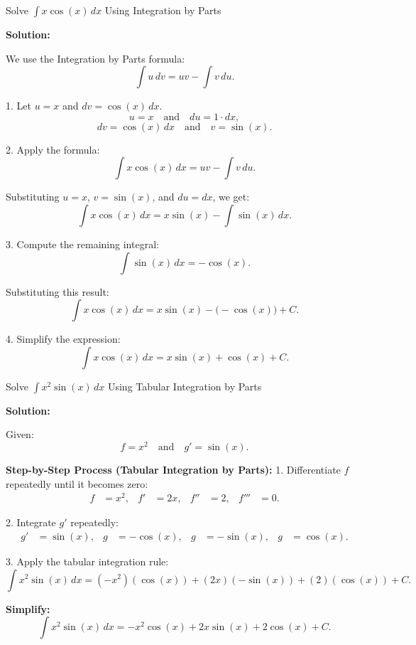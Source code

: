 \documentclass[12pt]{article}
\theoremstyle{beautifulthm}
\begin{document}
\begin{tcolorbox}[colback=examplebg, colframe=red!75!black, title=\textbf{EXAMPLE 1: Find the Integral of the Function}, fonttitle=\bfseries, sharp corners]
Solve \( \int x \cos(x) \, dx \) Using Integration by Parts


\tcblower
\textbf{Solution:} 

We use the Integration by Parts formula:
\[
\int u \, dv = uv - \int v \, du.
\]

1. Let \( u = x \) and \( dv = \cos(x) \, dx \).
   \[
   u = x \quad \text{and} \quad du = 1 \cdot dx,
   \]
   \[
   dv = \cos(x) \, dx \quad \text{and} \quad v = \sin(x).
   \]

2. Apply the formula:
   \[
   \int x \cos(x) \, dx = u v - \int v \, du.
   \]

   Substituting \( u = x \), \( v = \sin(x) \), and \( du = dx \), we get:
   \[
   \int x \cos(x) \, dx = x \sin(x) - \int \sin(x) \, dx.
   \]

3. Compute the remaining integral:
   \[
   \int \sin(x) \, dx = -\cos(x).
   \]

   Substituting this result:
   \[
   \int x \cos(x) \, dx = x \sin(x) - \big(-\cos(x)\big) + C.
   \]

4. Simplify the expression:
   \[
   \int x \cos(x) \, dx = x \sin(x) + \cos(x) + C.
   \]

\end{tcolorbox}

\begin{tcolorbox}[colback=examplebg, colframe=red!75!black, title=\textbf{EXAMPLE 2: Find the Integral of the Function}, fonttitle=\bfseries, sharp corners]

Solve \( \int x^2 \sin(x) \, dx \) Using Tabular Integration by Parts

\tcblower
\textbf{Solution:} 

Given:
\[
f = x^2 \quad \text{and} \quad g' = \sin(x).
\]

\textbf{Step-by-Step Process (Tabular Integration by Parts):}
1. Differentiate \( f \) repeatedly until it becomes zero:
\[
\begin{aligned}
f &= x^2, & f' &= 2x, & f'' &= 2, & f''' &= 0.
\end{aligned}
\]

2. Integrate \( g' \) repeatedly:
\[
\begin{aligned}
g' &= \sin(x), & g &= -\cos(x), & g &= -\sin(x), & g &= \cos(x).
\end{aligned}
\]

3. Apply the tabular integration rule:
\[
\int x^2 \sin(x) \, dx = 
(-x^2)(\cos(x)) + (2x)(-\sin(x)) + (2)(\cos(x)) + C.
\]

\textbf{Simplify:}
\[
\int x^2 \sin(x) \, dx = 
-x^2 \cos(x) + 2x \sin(x) + 2 \cos(x) + C.
\]
\end{tcolorbox}
\end{document}
